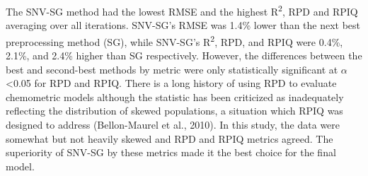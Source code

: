 \documentclass[
]{agujournal2019}
\begin{document}
The SNV-SG method had the lowest RMSE and the highest
R\textsuperscript{2}, RPD and RPIQ averaging over all iterations.
SNV-SG's RMSE was 1.4\% lower than the next best preprocessing method
(SG), while SNV-SG's R\textsuperscript{2}, RPD, and RPIQ were 0.4\%,
2.1\%, and 2.4\% higher than SG respectively. However, the differences
between the best and second-best methods by metric were only
statistically significant at \(\alpha\) \textless0.05 for RPD and RPIQ.
There is a long history of using RPD to evaluate chemometric models
although the statistic has been criticized as inadequately reflecting
the distribution of skewed populations, a situation which RPIQ was
designed to address (Bellon-Maurel et al., 2010). In this study, the
data were somewhat but not heavily skewed and RPD and RPIQ metrics
agreed. The superiority of SNV-SG by these metrics made it the best
choice for the final model.
\end{document}
